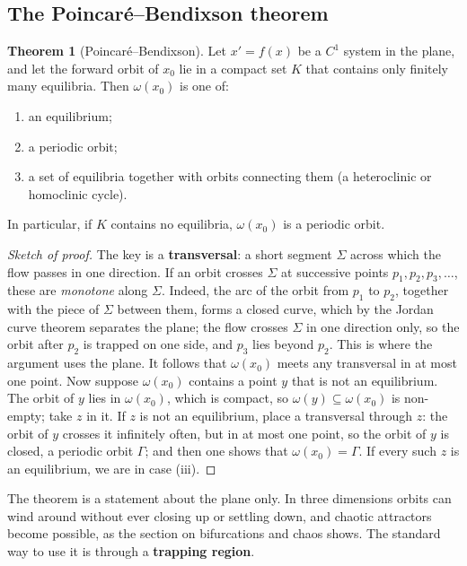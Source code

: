 \documentclass[11pt,a4paper]{article}
\numberwithin{equation}{section}
\theoremstyle{definition}
\newtheorem{thm}{Theorem}[subsection]
\begin{document}
\subsection{The Poincar\'e--Bendixson theorem}
\label{ssec:pb}

\begin{thm}[Poincar\'e--Bendixson]
\label{thm:pb}
Let $x' = f(x)$ be a $C^1$ system in the plane, and let the forward orbit of $x_0$ lie in a compact set $K$ that contains only finitely many equilibria. Then $\omega(x_0)$ is one of:
\begin{enumerate}[label=(\roman*)]
\item an equilibrium;
\item a periodic orbit;
\item a set of equilibria together with orbits connecting them (a heteroclinic or homoclinic cycle).
\end{enumerate}
In particular, if $K$ contains no equilibria, $\omega(x_0)$ is a periodic orbit.
\end{thm}

\begin{proof}[Sketch of proof]
The key is a \textbf{transversal}: a short segment $\Sigma$ across which the flow passes in one direction. If an orbit crosses $\Sigma$ at successive points $p_1, p_2, p_3, \dots$, these are \emph{monotone}
along $\Sigma$. Indeed, the arc of the orbit from $p_1$ to $p_2$, together with the piece of $\Sigma$ between them, forms a closed curve, which by the Jordan curve theorem separates the plane;
the flow crosses $\Sigma$ in one direction only, so the orbit after $p_2$ is trapped on one side, and $p_3$ lies beyond $p_2$. This is where the argument uses the plane. It follows that $\omega(x_0)$ meets any
transversal in at most one point. Now suppose $\omega(x_0)$ contains a point $y$ that is not an equilibrium. The orbit of $y$ lies in $\omega(x_0)$, which is compact, so $\omega(y) \subseteq \omega(x_0)$ is non-empty; take $z$ in it.
If $z$ is not an equilibrium, place a transversal through $z$: the orbit of $y$ crosses it infinitely often, but in at most one point, so the orbit of $y$ is closed, a periodic orbit $\Gamma$; and then
one shows that $\omega(x_0) = \Gamma$. If every such $z$ is an equilibrium, we are in case (iii).
\end{proof}

The theorem is a statement about the plane only. In three dimensions orbits can wind around without ever closing up or settling down, and chaotic attractors become possible, as the
section on bifurcations and chaos shows. The standard way to use it is through a \textbf{trapping region}.
\end{document}
